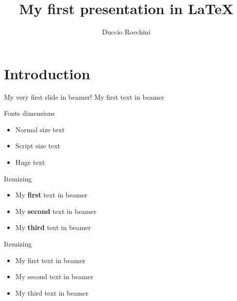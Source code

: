 \documentclass{beamer}
\title{My first presentation in LaTeX}
\author{Duccio Rocchini}
\institute{
Talk held at: \\
\bigskip
\texttt{[image: 2025-living-planet-symposium.png]}
}
\begin{document}
\maketitle


\section{Introduction}

\begin{frame}{My very first slide in beamer!}
    My first text in beamer
\end{frame}

\begin{frame}{Fonts dimensions}
    \begin{itemize}
        \item Normal size text 
        \item \scriptsize{Script size text}
        \item \huge{Huge text}
    \end{itemize}
\end{frame}


\begin{frame}{Itemizing}
    \begin{itemize}
        \item My \textbf{first} text in beamer
        \item My \textbf{second} text in beamer
        \item My \textbf{third} text in beamer
    \end{itemize}
\end{frame}

\begin{frame}{Itemizing}
    \begin{itemize}
        \item My first text in beamer
        \pause \item My second text in beamer
        \pause \item My third text in beamer
    \end{itemize}
\end{frame}
\end{document}
